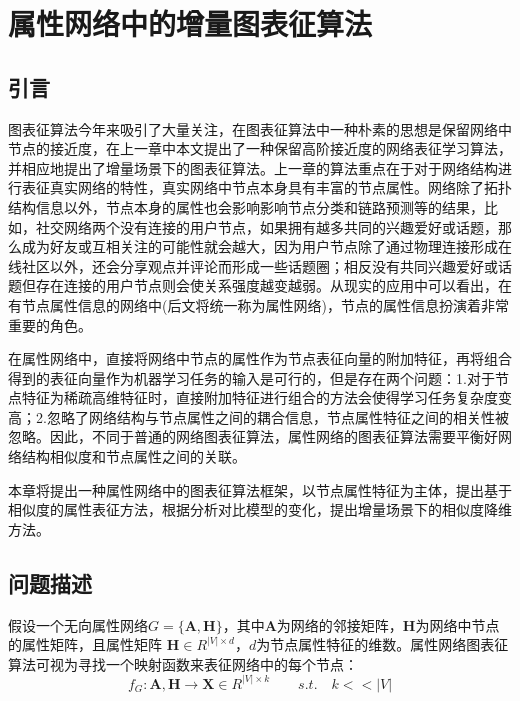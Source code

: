 \chapter{属性网络中的增量图表征算法}
\section{引言}
图表征算法今年来吸引了大量关注，在图表征算法中一种朴素的思想是保留网络中节点的接近度，在上一章中本文提出了一种保留高阶接近度的网络表征学习算法，并相应地提出了增量场景下的图表征算法。上一章的算法重点在于对于网络结构进行表征真实网络的特性，真实网络中节点本身具有丰富的节点属性。网络除了拓扑结构信息以外，节点本身的属性也会影响影响节点分类和链路预测等的结果，比如，社交网络两个没有连接的用户节点，如果拥有越多共同的兴趣爱好或话题，那么成为好友或互相关注的可能性就会越大，因为用户节点除了通过物理连接形成在线社区以外，还会分享观点并评论而形成一些话题圈；相反没有共同兴趣爱好或话题但存在连接的用户节点则会使关系强度越变越弱。从现实的应用中可以看出，在有节点属性信息的网络中(后文将统一称为属性网络)，节点的属性信息扮演着非常重要的角色。

在属性网络中，直接将网络中节点的属性作为节点表征向量的附加特征，再将组合得到的表征向量作为机器学习任务的输入是可行的，但是存在两个问题：1.对于节点特征为稀疏高维特征时，直接附加特征进行组合的方法会使得学习任务复杂度变高；2.忽略了网络结构与节点属性之间的耦合信息，节点属性特征之间的相关性被忽略。因此，不同于普通的网络图表征算法，属性网络的图表征算法需要平衡好网络结构相似度和节点属性之间的关联\cite{huang2017label}。

本章将提出一种属性网络中的图表征算法框架，以节点属性特征为主体，提出基于相似度的属性表征方法，根据分析对比模型的变化，提出增量场景下的相似度降维方法。

\section{问题描述}
假设一个无向属性网络$G=\{\textbf{A}, \textbf{H}\}$，其中\textbf{A}为网络的邻接矩阵，\textbf{H}为网络中节点的属性矩阵，且属性矩阵 $\textbf{H}\in R^{|V|\times d}$，$d$为节点属性特征的维数。属性网络图表征算法可视为寻找一个映射函数来表征网络中的每个节点：
\begin{equation}
f_G: \textbf{A}, \textbf{H} \rightarrow \textbf{X} \in R^{|V| \times k} \qquad s.t.\quad k<<|V|
\end{equation}

